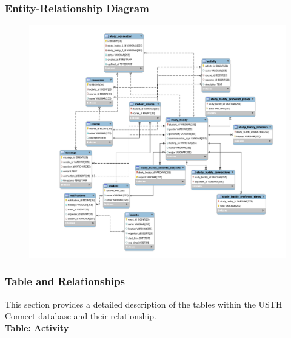 \documentclass[12pt]{article}
\begin{document}
\subsubsection{Entity-Relationship Diagram}
\begin{figure}[H]
    \centering
    \includegraphics[width=\paperwidth,height=\paperheight,keepaspectratio]{image/USTH-Connect-Database-Schema-v1-cropped.pdf}
\end{figure}
\restoregeometry

\subsubsection{Table and Relationships}
This section provides a detailed description of the tables within the USTH Connect database and their relationship. \\

\textbf{Table: Activity} \\
\end{document}
